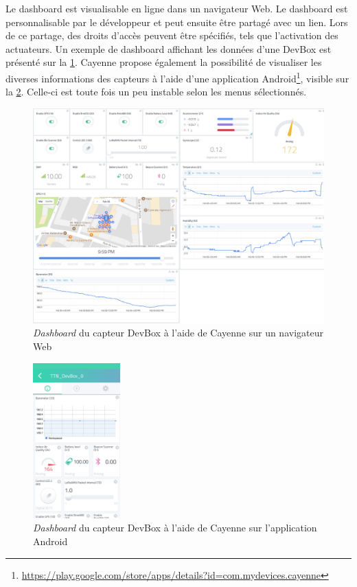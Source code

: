 Le dashboard est visualisable en ligne dans un navigateur Web. Le dashboard est personnalisable par le développeur et peut ensuite être partagé avec un lien. Lors de ce partage, des droits d'accès peuvent être spécifiés, tels que l'activation des actuateurs. Un exemple de dashboard affichant les données d'une DevBox est présenté sur la \cref{fig-cayenne_dashboard_allsensors}.
Cayenne propose également la possibilité de visualiser les diverses informations des capteurs à l'aide d'une application Android\footnote{\url{https://play.google.com/store/apps/details?id=com.mydevices.cayenne}}, visible sur la \cref{fig-cayenne_dashboard_allsensors_android}. Celle-ci est toute fois un peu instable selon les menus sélectionnés.

\begin{figure}[ht!]
    \centering
    \includegraphics[width=1.0\textwidth]{Figures/UseCase/cayenne_dashboard_allsensors.png}
    \caption{\textit{Dashboard} du capteur DevBox à l'aide de Cayenne sur un navigateur Web}
    \label{fig-cayenne_dashboard_allsensors}
\end{figure}


\begin{figure}[ht!]
    \centering
    \includegraphics[width=0.3\textwidth]{Figures/UseCase/cayenne_dashboard_allsensors_android.png}
    \caption{\textit{Dashboard} du capteur DevBox à l'aide de Cayenne sur l'application Android}
    \label{fig-cayenne_dashboard_allsensors_android}
\end{figure}


